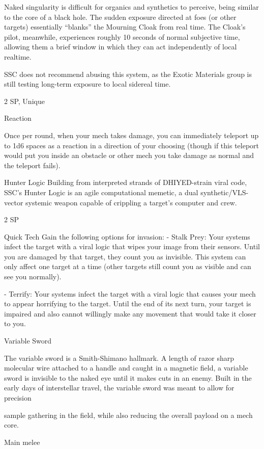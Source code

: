 Naked singularity is difficult for organics and synthetics to perceive, being similar to the core of a black hole.
The sudden exposure directed at foes (or other targets) essentially “blanks” the Mourning Cloak from real
time. The Cloak’s pilot, meanwhile, experiences roughly 10 seconds of normal subjective time, allowing
them a brief window in which they can act independently of local realtime.

SSC does not recommend abusing this system, as the Exotic Materials group is still testing long-term
exposure to local sidereal time.

2 SP, Unique

Reaction

Once per round, when your mech takes damage, you can immediately teleport up to 1d6 spaces
as a reaction in a direction of your choosing (though if this teleport would put you inside an
obstacle or other mech you take damage as normal and the teleport fails).


Hunter Logic
Building from interpreted strands of DHIYED-strain viral code, SSC’s Hunter Logic is an agile computational
memetic, a dual synthetic/VLS-vector systemic weapon capable of crippling a target’s computer and crew.

2 SP


Quick Tech
Gain the following options for invasion:
         - Stalk Prey: Your systems infect the target with a viral logic that wipes your image from
their sensors. Until you are damaged by that target, they count you as invisible. This system can
only affect one target at a time (other targets still count you as visible and can see you normally).

	        - Terrify: Your systems infect the target with a viral logic that causes your mech to appear
horrifying to the target. Until the end of its next turn, your target is impaired and also cannot
willingly make any movement that would take it closer to you.


Variable Sword

The variable sword is a Smith-Shimano hallmark. A length of razor sharp molecular wire attached to a
handle and caught in a magnetic field, a variable sword is invisible to the naked eye until it makes cuts in an
enemy. Built in the early days of interstellar travel, the variable sword was meant to allow for precision

sample gathering in the field, while also reducing the overall payload on a mech core.

Main melee

